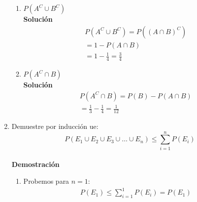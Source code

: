 \begin{enumerate}
\begin{enumerate}
        \item $P(A^C \cup B^C)$
    	\\\textbf{Solución}
        \begin{gather*}
            P(A^C \cup B^C) = P((A \cap B)^C) \\
            = 1 - P(A \cap B) \\
            = 1 - \frac{1}{4} = \frac{3}{4}
    	\end{gather*}

        \item $P(A^C \cap B)$
    	\\\textbf{Solución}
        \begin{gather*}
            P(A^C \cap B) = P(B) - P(A \cap B) \\
            = \frac{1}{3} - \frac{1}{4} = \frac{1}{12}
    	\end{gather*}

    \end{enumerate}
	
	\item Demuestre por inducción  ue: $$P(E_1 \cup E_2 \cup E_3 \cup \ldots \cup E_n) \leq \sum_{i=1}^{n} P(E_i)$$
	\\\textbf{Demostración}
    \begin{enumerate}
        \item Probemos para $n=1$:
        \begin{gather*}
            P(E_1) \leq \sum_{i=1}^{1} P(E_i) = P(E_1)
    	\end{gather*}


\end{enumerate}
\end{enumerate}
